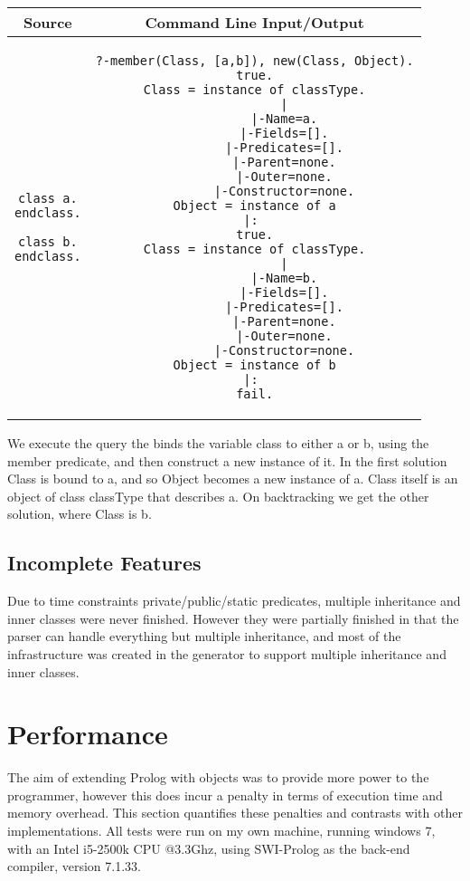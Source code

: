 \documentclass[12pt,a4paper,twoside,openright]{report}
\begin{document}
	\begin{center}
\begin{tabular}{c|c}
Source & Command Line Input/Output \\
\hline
	\small
\begin{lstlisting}
class a.
endclass.

class b.
endclass.
\end{lstlisting}
&
	\small
\begin{lstlisting}
?-member(Class, [a,b]), new(Class, Object).
true.
Class = instance of classType.
        |
        |-Name=a.
        |-Fields=[].
        |-Predicates=[].
        |-Parent=none.
        |-Outer=none.
        |-Constructor=none.
Object = instance of a
|: 
true.
Class = instance of classType.
        |
        |-Name=b.
        |-Fields=[].
        |-Predicates=[].
        |-Parent=none.
        |-Outer=none.
        |-Constructor=none.
Object = instance of b
|: 
fail.
\end{lstlisting}
\\
\end{tabular}
\end{center}

We execute the query the binds the variable class to either a or b, using the member predicate, and then construct a new instance of it. In the first solution Class is bound to a, and so Object becomes a new instance of a. Class itself is an object of class classType that describes a. On backtracking we get the other solution, where Class is b.

\subsection{Incomplete Features}

Due to time constraints private/public/static predicates, multiple inheritance and inner classes were never finished.  However they were partially finished in that the parser can handle everything but multiple inheritance, and most of the infrastructure was created in the generator to support multiple inheritance and inner classes. 

\section{Performance}

The aim of extending Prolog with objects was to provide more power to the programmer, however this does incur a penalty in terms of execution time and memory overhead. This section quantifies these penalties and contrasts with other implementations. All tests were run on my own machine, running windows 7, with an Intel i5-2500k CPU @3.3Ghz, using SWI-Prolog as the back-end compiler, version 7.1.33.
\end{document}
